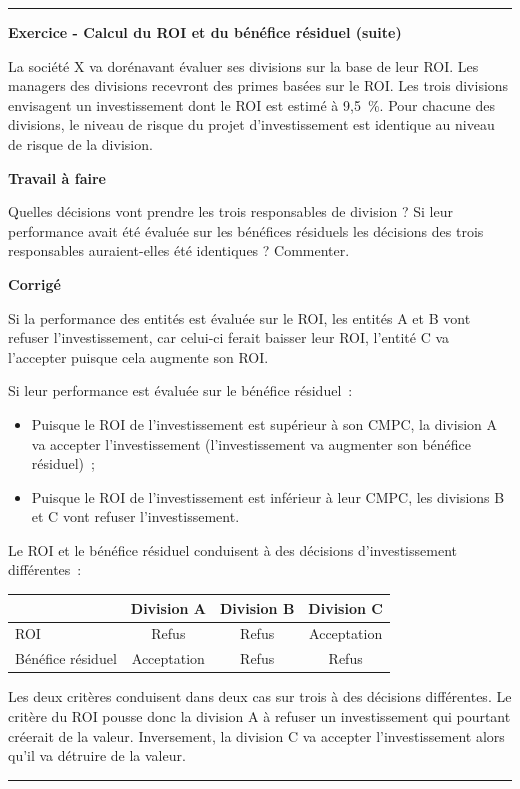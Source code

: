 \documentclass[oneside]{kaobook}
\begin{document}
\noindent\rule{\textwidth}{0.5pt}
\textbf{Exercice - Calcul du ROI et du bénéfice résiduel (suite)}

La société X va dorénavant évaluer ses divisions sur la base de leur ROI. Les managers des divisions recevront des primes basées sur le ROI. Les trois divisions envisagent un investissement dont le ROI est estimé à 9,5 \%. Pour chacune des divisions, le niveau de risque du projet d'investissement est identique au niveau de risque de la division.

\textbf{Travail à faire}

Quelles décisions vont prendre les trois responsables de division ? Si leur performance avait été évaluée sur les bénéfices résiduels les décisions des trois responsables auraient-elles été identiques ? Commenter. 

\textbf{Corrigé}

Si la performance des entités est évaluée sur le ROI, les entités A et B vont refuser l'investissement, car celui-ci ferait baisser leur ROI, l'entité C va l'accepter puisque cela augmente son ROI.

Si leur performance est évaluée sur le bénéfice résiduel :
\begin{itemize}
\item Puisque le ROI de l'investissement est supérieur à son CMPC, la division A va accepter l'investissement (l'investissement va augmenter son bénéfice résiduel) ;
\item Puisque le ROI de l'investissement est inférieur à leur CMPC, les divisions B et C vont refuser l'investissement.
\end{itemize}
Le ROI et le bénéfice résiduel conduisent à des décisions d'investissement différentes :
\begin{center}
\sidenotesize
\begin{tabular}{l c c c}
 & Division A & Division B & Division C\\
\hline
ROI & Refus & Refus & Acceptation\\
Bénéfice résiduel & Acceptation & Refus & Refus\\
\end{tabular}
\end{center}
Les deux critères conduisent dans deux cas sur trois à des décisions différentes. Le critère du ROI pousse donc la division A à refuser un investissement qui pourtant créerait de la valeur. Inversement, la division C va accepter l'investissement alors qu'il va détruire de la valeur.

\noindent\rule{\textwidth}{0.5pt}
\end{document}
